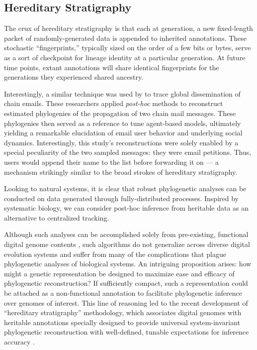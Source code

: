 \subsection{Hereditary Stratigraphy}

The crux of hereditary stratigraphy is that each at generation, a new fixed-length packet of randomly-generated data is appended to inherited annotations.
These stochastic ``fingerprints,'' typically sized on the order of a few bits or bytes, serve as a sort of checkpoint for lineage identity at a particular generation.
At future time points, extant annotations will share identical fingerprints for the generations they experienced shared ancestry.

Interestingly, a similar technique was used by \cite{libennowell2008tracing} to trace global dissemination of chain emails.
These researchers applied \textit{post-hoc} methods to reconstruct estimated phylogenies of the propagation of two chain mail messages.
These phylogenies then served as a reference to tune agent-based models, ultimately yielding a remarkable elucidation of email user behavior and underlying social dynamics.
Interestingly, this study's reconstructions were solely enabled by a special peculiarity of the two sampled messages: they were email petitions.
Thus, users would append their name to the list before forwarding it on --- a mechanism strikingly similar to the broad strokes of hereditary stratigraphy.


Looking to natural systems, it is clear that robust phylogenetic analyses can be conducted on data generated through fully-distributed processes.
Inspired by systematic biology, we can consider post-hoc inference from heritable data as an alternative to centralized tracking.

Although such analyses can be accomplished solely from pre-existing, functional digital genome contents \citep{moreno2021case}, such algorithms do not generalize across diverse digital evolution systems and suffer from many of the complications that plague phylogenetic analyses of biological systems.
An intriguing proposition arises: how might a genetic representation be designed to maximize ease and efficacy of phylogenetic reconstruction?
If sufficiently compact, such a representation could be attached as a non-functional annotation to facilitate phylogenetic inference over genomes of interest.
This line of reasoning led to the recent development of ``hereditary stratigraphy'' methodology, which associates digital genomes with heritable annotations specially designed to provide universal system-invariant phylogenetic reconstruction with well-defined, tunable expectations for inference accuracy
\citep{moreno2022hereditary}.


